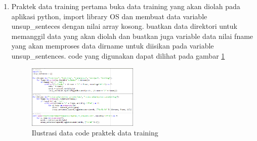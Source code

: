 \begin{enumerate}
\item Praktek data training
\subitem pertama buka data training yang akan diolah pada aplikasi python, import library OS dan membuat data variable unsup\_senteces dengan nilai array kosong. buatkan data direktori untuk memanggil data yang akan diolah dan buatkan juga variable data nilai fname yang akan memproses data dirname untuk diisikan pada variable unsup\_sentences. code yang digunakan dapat dilihat pada gambar \ref{d22}
\begin{figure}[!htbp]
	\centering
	\includegraphics[width=0.5\textwidth]{figures/fathi/chapter5/hari3/2}
	\caption{Ilustrasi data code praktek data training }
	\label{d22}
\end{figure}


\end{enumerate}

